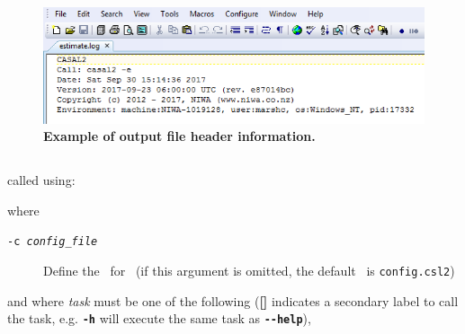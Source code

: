 \begin{figure}[htp]
	\includegraphics[scale=1]{Figures/eglog.png}
	\caption{\textbf{Example of output file header information.}}\label{fig:log_file_1}
\end{figure}

\vspace*{4mm}

\subsection{\label{sec:command-line-arguments}}

\CNAME\is called using:

\texttt{}

where

\begin{description}
  \item [\texttt{-c \emph{config\_file}}] Define the \config~for \CNAME\ (if this argument is omitted, the default \config\ is \texttt{config.csl2})
\end{description}

and where \emph{task} must be one of the following (\textbf{[]} indicates a secondary label to call the task, e.g. \textbf{\texttt{-h}} will execute the same task as \textbf{\texttt{-{}-help}}),

